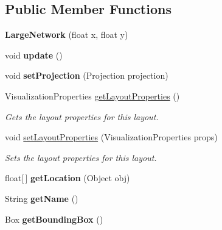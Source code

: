 \subsection*{Public Member Functions}
\begin{DoxyCompactItemize}
\item 
\hypertarget{classuk_1_1ac_1_1dmu_1_1iesd_1_1cascade_1_1ui_1_1_large_network_a9cdd2aa91a4cfe251453918e738533ad}{{\bfseries Large\-Network} (float x, float y)}\label{classuk_1_1ac_1_1dmu_1_1iesd_1_1cascade_1_1ui_1_1_large_network_a9cdd2aa91a4cfe251453918e738533ad}

\item 
\hypertarget{classuk_1_1ac_1_1dmu_1_1iesd_1_1cascade_1_1ui_1_1_large_network_a5b1093e06633a11c3087ba88f7530a9d}{void {\bfseries update} ()}\label{classuk_1_1ac_1_1dmu_1_1iesd_1_1cascade_1_1ui_1_1_large_network_a5b1093e06633a11c3087ba88f7530a9d}

\item 
\hypertarget{classuk_1_1ac_1_1dmu_1_1iesd_1_1cascade_1_1ui_1_1_large_network_a70fe30acfa1ec839ba7c54b739c2bd62}{void {\bfseries set\-Projection} (Projection projection)}\label{classuk_1_1ac_1_1dmu_1_1iesd_1_1cascade_1_1ui_1_1_large_network_a70fe30acfa1ec839ba7c54b739c2bd62}

\item 
Visualization\-Properties \hyperlink{classuk_1_1ac_1_1dmu_1_1iesd_1_1cascade_1_1ui_1_1_large_network_a609fd3c370b53c0d5d46fde05a86792b}{get\-Layout\-Properties} ()
\begin{DoxyCompactList}\small\item\em Gets the layout properties for this layout. \end{DoxyCompactList}\item 
void \hyperlink{classuk_1_1ac_1_1dmu_1_1iesd_1_1cascade_1_1ui_1_1_large_network_a000dcb4dd83a3568a9291e77f6c79b0e}{set\-Layout\-Properties} (Visualization\-Properties props)
\begin{DoxyCompactList}\small\item\em Sets the layout properties for this layout. \end{DoxyCompactList}\item 
\hypertarget{classuk_1_1ac_1_1dmu_1_1iesd_1_1cascade_1_1ui_1_1_large_network_a8f1f6959ad3567cfad405c166b01f9ea}{float\mbox{[}$\,$\mbox{]} {\bfseries get\-Location} (Object obj)}\label{classuk_1_1ac_1_1dmu_1_1iesd_1_1cascade_1_1ui_1_1_large_network_a8f1f6959ad3567cfad405c166b01f9ea}

\item 
\hypertarget{classuk_1_1ac_1_1dmu_1_1iesd_1_1cascade_1_1ui_1_1_large_network_a81d6ff1593a96b07f58508ccef22b7a4}{String {\bfseries get\-Name} ()}\label{classuk_1_1ac_1_1dmu_1_1iesd_1_1cascade_1_1ui_1_1_large_network_a81d6ff1593a96b07f58508ccef22b7a4}

\item 
\hypertarget{classuk_1_1ac_1_1dmu_1_1iesd_1_1cascade_1_1ui_1_1_large_network_af617367ea746247a8f41915ae3461c28}{Box {\bfseries get\-Bounding\-Box} ()}\label{classuk_1_1ac_1_1dmu_1_1iesd_1_1cascade_1_1ui_1_1_large_network_af617367ea746247a8f41915ae3461c28}

\end{DoxyCompactItemize}


